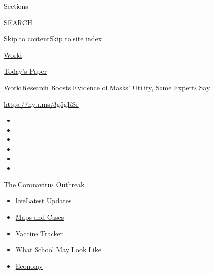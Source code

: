 Sections

SEARCH

\protect\hyperlink{site-content}{Skip to
content}\protect\hyperlink{site-index}{Skip to site index}

\href{https://www.nytimes.com/section/world}{World}

\href{https://myaccount.nytimes.com/auth/login?response_type=cookie\&client_id=vi}{}

\href{https://www.nytimes.com/section/todayspaper}{Today's Paper}

\href{/section/world}{World}\textbar{}Research Boosts Evidence of Masks'
Utility, Some Experts Say

\url{https://nyti.ms/3g5gKSr}

\begin{itemize}
\item
\item
\item
\item
\item
\item
\end{itemize}

\href{https://www.nytimes.com/news-event/coronavirus?action=click\&pgtype=Article\&state=default\&region=TOP_BANNER\&context=storylines_menu}{The
Coronavirus Outbreak}

\begin{itemize}
\tightlist
\item
  live\href{https://www.nytimes.com/2020/08/01/world/coronavirus-covid-19.html?action=click\&pgtype=Article\&state=default\&region=TOP_BANNER\&context=storylines_menu}{Latest
  Updates}
\item
  \href{https://www.nytimes.com/interactive/2020/us/coronavirus-us-cases.html?action=click\&pgtype=Article\&state=default\&region=TOP_BANNER\&context=storylines_menu}{Maps
  and Cases}
\item
  \href{https://www.nytimes.com/interactive/2020/science/coronavirus-vaccine-tracker.html?action=click\&pgtype=Article\&state=default\&region=TOP_BANNER\&context=storylines_menu}{Vaccine
  Tracker}
\item
  \href{https://www.nytimes.com/interactive/2020/07/29/us/schools-reopening-coronavirus.html?action=click\&pgtype=Article\&state=default\&region=TOP_BANNER\&context=storylines_menu}{What
  School May Look Like}
\item
  \href{https://www.nytimes.com/live/2020/07/31/business/stock-market-today-coronavirus?action=click\&pgtype=Article\&state=default\&region=TOP_BANNER\&context=storylines_menu}{Economy}
\end{itemize}

